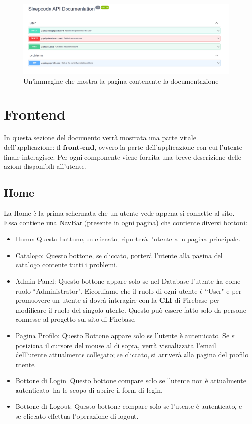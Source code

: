 \documentclass[11pt, a4paper]{article}
\theoremstyle{definition}
\begin{document}
\begin{figure}[H]
  \centering
  \includegraphics[width=\textwidth]{materiale/API/API-doc.png}
  \caption{Un'immagine che mostra la pagina contenente la documentazione}
  \label{documentazione}
\end{figure}

\newpage
\section{Frontend}
In questa sezione del documento verrà mostrata una parte vitale dell'applicazione: il \textbf{front-end}, ovvero la parte dell'applicazione con cui l'utente finale interagisce.
Per ogni componente viene fornita una breve descrizione delle azioni disponibili all'utente.

\subsection{Home}
La Home è la prima schermata che un utente vede appena si connette al sito. Essa contiene una NavBar (presente in ogni pagina) che contiente diversi bottoni:
\begin{itemize}
  \item Home: Questo bottone, se cliccato, riporterà l'utente alla pagina principale.
  \item Catalogo: Questo bottone, se cliccato, porterà l'utente alla pagina del catalogo contente tutti i problemi.
  \item Admin Panel: Questo bottone appare solo se nel Database l'utente ha come ruolo ``Administrator". Eicordiamo che il ruolo di ogni utente è ``User" e per promuovere un utente
  si dovrà interagire con la \textbf{CLI} di Firebase per modificare il ruolo del singolo utente. Questo può essere fatto solo da persone connesse al progetto sul sito di Firebase.
  \item Pagina Profilo: Questo Bottone appare solo se l'utente è autenticato. Se si posiziona il cursore del mouse al di sopra, verrà visualizzata l'email dell'utente attualmente collegato; se cliccato, si arriverà alla pagina del profilo utente.
  \item Bottone di Login: Questo bottone compare solo se l'utente non è attualmente autenticato; ha lo scopo di aprire il form di login.
  \item Bottone di Logout: Questo bottone compare solo se l'utente è autenticato, e se cliccato effettua l'operazione di logout.
\end{itemize}
\end{document}
